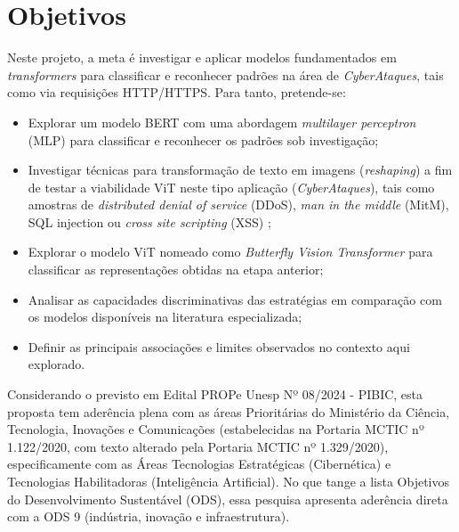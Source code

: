 \section{Objetivos}

Neste projeto, a meta é investigar e aplicar modelos fundamentados em \textit{transformers} para classificar e reconhecer padrões na área de \textit{CyberAtaques}, tais como via requisições HTTP/HTTPS. Para tanto, pretende-se:

\begin{itemize}
    \item 
    Explorar um modelo BERT com uma abordagem \textit{multilayer perceptron} (MLP) para classificar e reconhecer os padrões sob investigação;
    \item 
    Investigar técnicas para transformação de texto em imagens (\textit{reshaping}) a fim de testar a viabilidade ViT neste tipo aplicação (\textit{CyberAtaques}), tais como amostras de \textit{distributed denial of service} (DDoS), \textit{man in the middle} (MitM), SQL injection ou \textit{cross site scripting} (XSS) \cite{luxemburk2021detection};
    \item 
    Explorar o modelo ViT nomeado como \textit{Butterfly Vision Transformer} para classificar as representações obtidas na etapa anterior;
    \item
    Analisar as capacidades discriminativas das estratégias em comparação com os modelos disponíveis na literatura especializada;
    \item Definir as principais associações e limites observados no contexto aqui explorado.
    
\end{itemize}

Considerando o previsto em Edital PROPe Unesp Nº 08/2024 - PIBIC, esta proposta tem aderência plena com as áreas Prioritárias do Ministério da Ciência, Tecnologia, Inovações e Comunicações (estabelecidas na Portaria MCTIC nº 1.122/2020, com texto alterado pela Portaria MCTIC nº 1.329/2020), especificamente com as Áreas Tecnologias Estratégicas (Cibernética) e Tecnologias Habilitadoras (Inteligência Artificial). No que tange a lista Objetivos do Desenvolvimento Sustentável (ODS), essa pesquisa apresenta aderência direta com a ODS 9 (indústria, inovação e infraestrutura).
